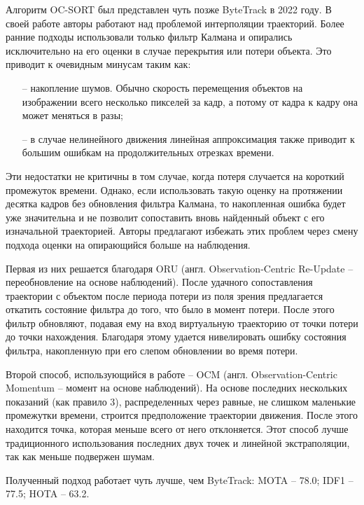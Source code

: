 Алгоритм OC-SORT \cite{cao2023observation} был представлен чуть позже ByteTrack в 2022 году. 
В своей работе авторы работают над проблемой интерполяции траекторий. Более ранние подходы использовали только фильтр Калмана и опирались исключительно на его оценки в случае перекрытия или потери объекта. 
Это приводит к очевидным минусам таким как: 
\begin{itemize}
    \item[--] накопление шумов. Обычно скорость перемещения объектов на изображении всего несколько пикселей за кадр, а потому от кадра к кадру она может меняться в разы;
    \item[--] в случае нелинейного движения линейная аппроксимация также приводит к большим ошибкам на продолжительных отрезках времени.
\end{itemize}
Эти недостатки не критичны в том случае, когда потеря случается на короткий промежуток времени. Однако, если использовать такую оценку на протяжении десятка кадров без обновления фильтра Калмана, то накопленная ошибка будет уже значительна и не позволит сопоставить вновь найденный объект с его изначальной траекторией.
Авторы предлагают избежать этих проблем через смену подхода оценки на опирающийся больше на наблюдения. 

Первая из них решается благодаря ORU (англ. Observation-Centric Re-Update -- переобновление на основе наблюдений). После удачного сопоставления траектории с объектом после периода потери из поля зрения предлагается откатить состояние фильтра до того, что было в момент потери. После этого фильтр обновляют, подавая ему на вход виртуальную траекторию от точки потери до точки нахождения. Благодаря этому удается нивелировать ошибку состояния фильтра, накопленную при его слепом обновлении во время потери.

Второй способ, использующийся в работе -- OCM (англ. Observation-Centric Momentum -- момент на основе наблюдений). На основе последних нескольких показаний (как правило 3), распределенных через равные, не слишком маленькие промежутки времени, строится предположение траектории движения. После этого находится точка, которая меньше всего от него отклоняется. Этот способ лучше традиционного использования последних двух точек и линейной экстраполяции, так как меньше подвержен шумам. 

Полученный подход работает чуть лучше, чем ByteTrack: MOTA -- 78.0; IDF1 -- 77.5; HOTA -- 63.2.